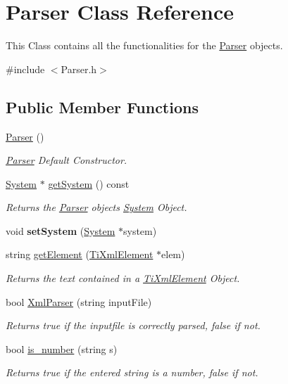 \hypertarget{classParser}{}\section{Parser Class Reference}
\label{classParser}


This Class contains all the functionalities for the \hyperlink{classParser}{Parser} objects.  




{\ttfamily \#include $<$Parser.\+h$>$}

\subsection*{Public Member Functions}
\begin{DoxyCompactItemize}
\item 
\hyperlink{classParser_a12234f6cd36b61af4b50c94a179422c1}{Parser} ()
\begin{DoxyCompactList}\small\item\em \hyperlink{classParser}{Parser} Default Constructor. \end{DoxyCompactList}\item 
\hyperlink{classSystem}{System} $\ast$ \hyperlink{classParser_addad80574e43b744a82807d0f821d414}{get\+System} () const 
\begin{DoxyCompactList}\small\item\em Returns the \hyperlink{classParser}{Parser} object\textquotesingle{}s \hyperlink{classSystem}{System} Object. \end{DoxyCompactList}\item 
void {\bfseries set\+System} (\hyperlink{classSystem}{System} $\ast$system)\hypertarget{classParser_aaf58c6aafde4e7b889fbaa5d1f3aa6fe}{}\label{classParser_aaf58c6aafde4e7b889fbaa5d1f3aa6fe}

\item 
string \hyperlink{classParser_a36b746dbf631544851e0af2d0e7c6982}{get\+Element} (\hyperlink{classTiXmlElement}{Ti\+Xml\+Element} $\ast$elem)
\begin{DoxyCompactList}\small\item\em Returns the text contained in a \hyperlink{classTiXmlElement}{Ti\+Xml\+Element} Object. \end{DoxyCompactList}\item 
bool \hyperlink{classParser_aa8cdba8032e5d5d87b249be597b196c7}{Xml\+Parser} (string input\+File)
\begin{DoxyCompactList}\small\item\em Returns true if the inputfile is correctly parsed, false if not. \end{DoxyCompactList}\item 
bool \hyperlink{classParser_a8f97eab6905436595f33dc82b8957bbd}{is\+\_\+number} (string s)
\begin{DoxyCompactList}\small\item\em Returns true if the entered string is a number, false if not. \end{DoxyCompactList}\end{DoxyCompactItemize}


